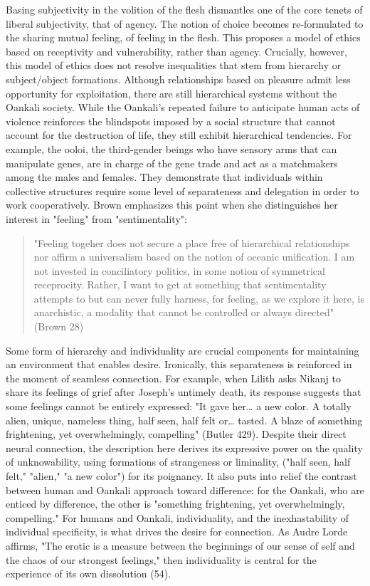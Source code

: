 \documentclass[11pt]{article}
\begin{document}
Basing subjectivity in the volition of the flesh dismantles one of the
core tenets of liberal subjectivity, that of agency. The notion of
choice becomes re-formulated to the sharing mutual feeling, of feeling
in the flesh. This proposes a model of ethics based on receptivity and
vulnerability, rather than agency. Crucially, however, this model of
ethics does not resolve inequalities that stem from hierarchy or
subject/object formations. Although relationships based on pleasure
admit less opportunity for exploitation, there are still hierarchical
systems without the Oankali society. While the Oankali's repeated
failure to anticipate human acts of violence reinforces the blindspots
imposed by a social structure that cannot account for the destruction
of life, they still exhibit hierarchical tendencies. For example, the
ooloi, the third-gender beings who have sensory arms that can
manipulate genes, are in charge of the gene trade and act as a
matchmakers among the males and females. They demonstrate that
individuals within collective structures require some level of
separateness and delegation in order to work cooperatively. Brown
emphasizes this point when she distinguishes her interest in "feeling"
from "sentimentality":
\begin{quote}
"Feeling togeher does not secure a place free of hierarchical
relationships nor affirm a universalism based on the notion of oceanic
unification. I am not invested in conciliatory politics, in some
notion of symmetrical receprocity. Rather, I want to get at something
that sentimentality attempts to but can never fully harness, for
feeling, as we explore it here, is anarchistic, a modality that cannot
be controlled or always directed" (Brown 28)
\end{quote}
Some form of hierarchy and individuality are crucial components for
maintaining an environment that enables desire. Ironically, this
separateness is reinforced in the moment of seamless connection. For
example, when Lilith asks Nikanj to share its feelings of grief after
Joseph's untimely death, its response suggests that some feelings
cannot be entirely expressed: "It gave her\ldots{} a new color. A totally
alien, unique, nameless thing, half seen, half felt or\ldots{} tasted. A
blaze of something frightening, yet overwhelmingly, compelling"
(Butler 429). Despite their direct neural connection, the description
here derives its expressive power on the quality of unknowability,
using formations of strangeness or liminality, ("half seen, half
felt," "alien," "a new color") for its poignancy. It also puts into
relief the contrast between human and Oankali approach toward
difference: for the Oankali, who are enticed by difference, the other
is "something frightening, yet overwhelmingly, compelling." For humans
and Oankali, individuality, and the inexhastability of individual
specificity, is what drives the desire for connection. As Audre Lorde
affirms, "The erotic is a measure between the beginnings of our sense
of self and the chaos of our strongest feelings," then individuality
is central for the experience of its own dissolution (54).
\end{document}
